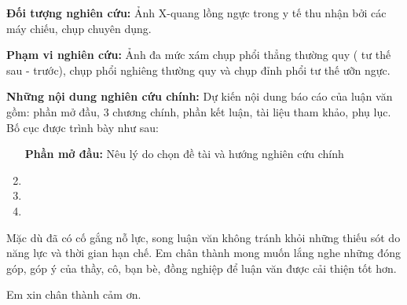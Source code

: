 \textbf{Đối tượng nghiên cứu:} Ảnh X-quang lồng ngực trong y tế thu nhận bởi các máy chiếu, chụp chuyên dụng.

\textbf{Phạm vi nghiên cứu:} Ảnh đa mức xám chụp phổi thẳng thường quy ( tư thế sau - trước), chụp phổi nghiêng thường quy và chụp đỉnh phổi tư thế ưỡn ngực.

\textbf{Những nội dung nghiên cứu chính:} Dự kiến nội dung báo cáo của luận văn gồm: phần mở đầu, 3 chương chính, phần kết luận, tài liệu tham khảo, phụ lục. Bố cục được trình bày như sau:

\begin{enumerate}[wide, label=\bfseries Chương \arabic*:]
	\item [\bfseries Phần mở đầu:] Nêu lý do chọn đề tài và hướng nghiên cứu chính
	\item \tenchuongi 
	\item \tenchuongii
	\item \tenchuongiii
\end{enumerate}

Mặc dù đã có cố gắng nỗ lực, song luận văn không tránh khỏi những thiếu sót do năng lực và thời gian hạn chế. Em chân thành mong muốn lắng nghe những đóng góp, góp ý của thầy, cô, bạn bè, đồng nghiệp để luận văn được cải thiện tốt hơn.

Em xin chân thành cảm ơn.
